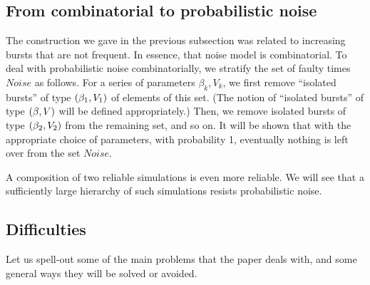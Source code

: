 \documentclass[12pt]{memoir}
\newcommand{\Noise}{\mathit{Noise}}
\begin{document}
\subsection{From combinatorial to probabilistic noise}

The construction we gave in the previous subsection
was related to increasing bursts that are not frequent.
In essence, that noise model is combinatorial.
To deal with probabilistic noise combinatorially,
we stratify the set of faulty times $\Noise$ as follows.
For a series of parameters \( \beta_{k}, V_{k} \),
we first remove ``isolated bursts'' of type \( (\beta_{1},V_{1}) \) of elements of this set.
(The notion of ``isolated bursts'' of type \( (\beta,V) \)
will be defined appropriately.)
Then, we remove isolated bursts of type \( (\beta_{2},V_{2}) \) from the remaining set,
and so on.
It will be shown that with the appropriate choice of parameters, with probability 1,
eventually nothing is left over from the set $\Noise$.

A composition of two reliable simulations is even more reliable.
We will see that a sufficiently large hierarchy of such
simulations resists probabilistic noise.


\subsection{Difficulties}\label{sec:novelties}

Let us spell-out some of the main problems that the paper deals with, 
and some general ways they will be solved or avoided.
\end{document}
